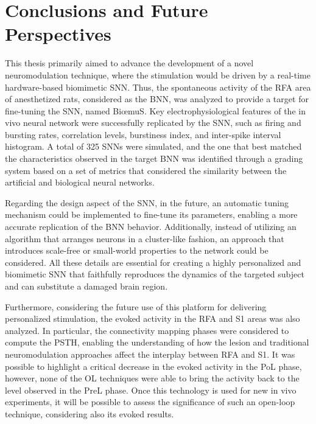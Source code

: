 \chapter*{Conclusions and Future Perspectives}

This thesis primarily aimed to advance the development of a novel neuromodulation technique, where the stimulation would be driven by a real-time hardware-based biomimetic SNN. Thus, the spontaneous activity of the RFA area of anesthetized rats, considered as the BNN, was analyzed to provide a target for fine-tuning the SNN, named Bi{\oe}muS. Key electrophysiological features of the in vivo neural network were successfully replicated by the SNN, such as firing and bursting rates, correlation levels, burstiness index, and inter-spike interval histogram. A total of 325 SNNs were simulated, and the one that best matched the characteristics observed in the target BNN was identified through a grading system based on a set of metrics that considered the similarity between the artificial and biological neural networks.

Regarding the design aspect of the SNN, in the future, an automatic tuning mechanism could be implemented to fine-tune its parameters, enabling a more accurate replication of the BNN behavior. Additionally, instead of utilizing an algorithm that arranges neurons in a cluster-like fashion, an approach that introduces scale-free or small-world properties to the network could be considered. All these details are essential for creating a highly personalized and biomimetic SNN that faithfully reproduces the dynamics of the targeted subject and can substitute a damaged brain region.

Furthermore, considering the future use of this platform for delivering personalized stimulation, the evoked activity in the RFA and S1 areas was also analyzed. In particular, the connectivity mapping phases were considered to compute the PSTH, enabling the understanding of how the lesion and traditional neuromodulation approaches affect the interplay between RFA and S1. It was possible to highlight a critical decrease in the evoked activity in the PoL phase, however, none of the OL techniques were able to bring the activity back to the level observed in the PreL phase. Once this technology is used for new in vivo experiments, it will be possible to assess the significance of such an open-loop technique, considering also its evoked results.